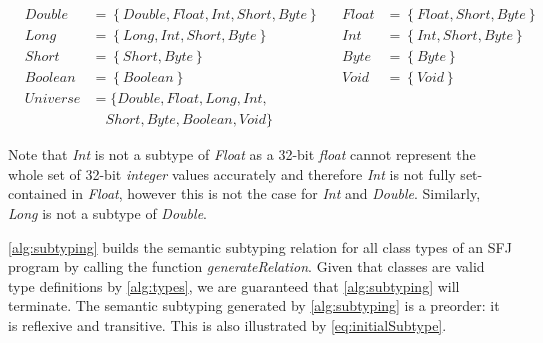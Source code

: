 \documentclass[runningheads]{llncs}
\begin{document}
\begin{equation}
    \label{eq:initialSubtype}
    \begin{array}{llllll}
        & Double   & = \left\{Double, Float, Int, Short, Byte\right\} &  & Float & = \left\{Float, Short, Byte\right\} \\
        & Long     & =    \left\{Long, Int, Short, Byte\right\}       &  & Int   & = \left\{Int, Short, Byte\right\}   \\
        & Short    & =    \left\{Short, Byte\right\}                  &  & Byte  & = \left\{Byte\right\}               \\
        & Boolean  & =    \left\{Boolean\right\}                      &  & Void  & = \left\{Void\right\}               \\
        & Universe & = \{Double, Float, Long, Int,                                                                     \\
        &          & \quad Short, Byte, Boolean, Void\}
   \end{array}
\end{equation}

Note that \emph{Int} is not a subtype of \emph{Float} as a 32-bit \emph{float} cannot represent the whole set of 32-bit \emph{integer} values accurately and therefore \emph{Int} is not fully set-contained in \emph{Float}, however this is not the case for \emph{Int} and \emph{Double}.
Similarly, \emph{Long} is not a subtype of \emph{Double}.

\autoref{alg:subtyping} builds the semantic subtyping relation for all class types of an SFJ program by calling the function \textit{generateRelation}.
Given that classes are valid type definitions by \autoref{alg:types}, we are guaranteed that \autoref{alg:subtyping} will terminate.
The semantic subtyping generated by \autoref{alg:subtyping} is a preorder: it is reflexive and transitive. This is also illustrated by \autoref{eq:initialSubtype}.
\end{document}
